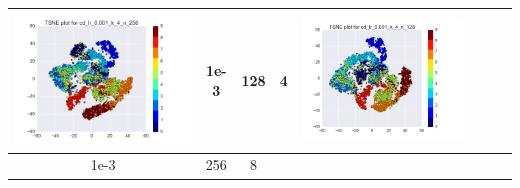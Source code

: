 \documentclass[12pt]{report}
\begin{document}
\begin{table}[H]
\begin{tabular}{ | c | c | c | c || c | c | c| c |}
\begin{minipage}{.3\textwidth}
      \includegraphics[scale=0.25]{cd_lr_0_001_k_4_n_256.png}
    \end{minipage}
     & 1e-3 & 128 & 4 &
    \begin{minipage}{.3\textwidth}
      \includegraphics[scale=0.25]{cd_lr_0_001_k_4_n_128.png}
    \end{minipage}
    \\ \hline
    1e-3 & 256 & 8 &
    \begin{minipage}{.3\textwidth}

\end{minipage}
\end{tabular}
\end{table}
\end{document}
